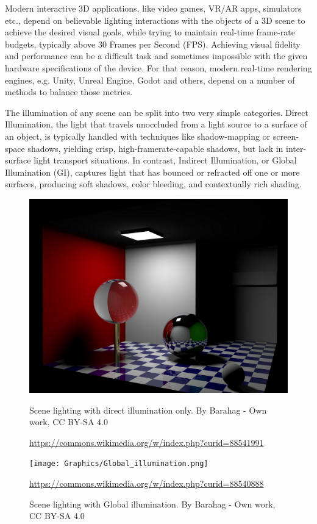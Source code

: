 Modern interactive 3D applications, like video games, VR/AR apps, simulators etc., depend on believable lighting interactions with the objects of a 3D scene to achieve the desired visual goals, while trying to maintain real-time frame-rate budgets, typically above 30 Frames per Second (FPS). Achieving visual fidelity and performance can be a difficult task and sometimes impossible with the given hardware specifications of the device. For that reason, modern real-time rendering engines, e.g. Unity, Unreal Engine, Godot and others, depend on a number of methods to balance those metrics. 

The illumination of any scene can be split into two very simple categories. Direct Illumination, the light that travels unoccluded from a light source to a surface of an object, is typically handled with techniques like shadow-mapping or screen-space shadows, yielding crisp, high-framerate-capable shadows, but lack in inter-surface light transport situations. In contrast, Indirect Illumination, or Global Illumination (GI), captures light that has bounced or refracted off one or more surfaces, producing soft shadows, color bleeding, and contextually rich shading. 

\begin{figure}[!htb]
	\begin{minipage}{0.48\textwidth}
		\centering
		\includegraphics[scale=0.65]{Graphics/Direct_lighting.png}
		\caption{Scene lighting with direct illumination only. By Barahag - Own work, CC BY-SA 4.0}
		\url{https://commons.wikimedia.org/w/index.php?curid=88541991}
		\label{Direct Illumination}
	\end{minipage}\hfill
	\begin{minipage}{0.48\textwidth}
		\centering
		\texttt{[image: Graphics/Global\_illumination.png]}
		\caption{Scene lighting with Global illumination. By Barahag - Own work, CC BY-SA 4.0}
		\url{https://commons.wikimedia.org/w/index.php?curid=88540888}
		\label{Global Illumination}
	\end{minipage}
\end{figure}

